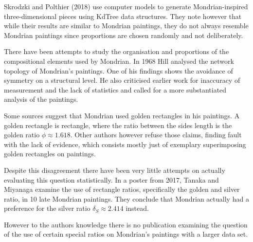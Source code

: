 \documentclass[serif,article,noparskip]{agse-thesis}
\begin{document}
Skrodzki and Polthier (2018) \cite{Skrodzki2018} use computer models to generate
Mondrian-inspired three-dimensional pieces using KdTree data structures. They
note however that while their results are similar to Mondrian paintings, they do
not always resemble Mondrian paintings since proportions are chosen randomly and
not deliberately.

There have been attempts to study the organisation and proportions of the
compositional elements used by Mondrian. In 1968 Hill \cite{Hill1968} analysed
the network topology of Mondrian's paintings. One of his findings shows the
avoidance of symmetry on a structural level. He also criticised earlier work for
inaccuracy of measurement and the lack of statistics and called for a more
substantiated analysis of the paintings.

Some sources \cite{bouleau1963,bergamini1980} suggest that Mondrian used golden
rectangles in his paintings. A golden rectangle is rectangle, where the ratio
between the sides length is the golden ratio $\phi \approx 1.618$. Other authors
however \cite{Livio2002,Markowsky1992} refuse those claims, finding fault with
the lack of evidence, which consists mostly just of exemplary superimposing
golden rectangles on paintings.

Despite this disagreement there have been very little attempts on actually
evaluating this question statistically. In a poster from 2017, Tanaka and
Miyanaga \cite{Tanaka2017} examine the use of rectangle ratios, specifically the
golden and silver ratio, in 10 late Mondrian paintings. They conclude that
Mondrian actually had a preference for the silver ratio $\delta_S \approx 2.414$ instead.

However to the authors knowledge there is no publication examining the question of
the use of certain special ratios on Mondrian's paintings with a larger data
set.

\end{document}

